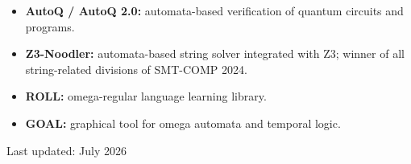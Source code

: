 \documentclass[11pt,a4paper]{article}
\begin{document}
\begin{itemize}
  \item \textbf{AutoQ / AutoQ 2.0:} automata-based verification of quantum circuits and programs.
  \item \textbf{Z3-Noodler:} automata-based string solver integrated with Z3; winner of all string-related divisions of SMT-COMP 2024.
  \item \textbf{ROLL:} omega-regular language learning library.
  \item \textbf{GOAL:} graphical tool for omega automata and temporal logic.
\end{itemize}

\vfill
\begin{center}
  \footnotesize\color{muted}Last updated: July 2026
\end{center}
\end{document}
